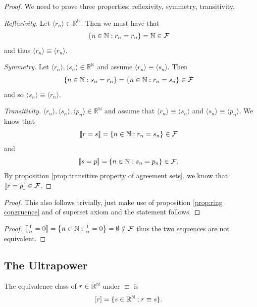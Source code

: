 \begin{proof}
    We need to prove three properties: reflexivity, symmetry, transitivity. 

    \emph{Reflexivity.} Let $\langle r_n \rangle \in \mathbb{R}^\mathbb{N}$. Then we must have that 
    $$
    \{ n \in \mathbb{N} : r_n = r_n \} = \mathbb{N} \in \mathcal{F}
    $$
    and thus $\langle r_n \rangle \equiv \langle r_n \rangle$.

    \emph{Symmetry.} Let $\langle r_n \rangle, \langle s_n \rangle \in \mathbb{R}^\mathbb{N}$ and assume $\langle r_n \rangle \equiv \langle s_n \rangle$. Then 
    $$
    \{ n \in \mathbb{N} : s_n = r_n \} = \{ n \in \mathbb{N} : r_n = s_n \} \in \mathcal{F}
    $$
    and so $\langle s_n \rangle \equiv \langle r_n \rangle$.

    \emph{Transitivity.} $\langle r_n \rangle, \langle s_n \rangle, \langle p_n \rangle \in \mathbb{R}^\mathbb{N}$ and assume that $\langle r_n \rangle \equiv \langle s_n \rangle$ and $\langle s_n \rangle \equiv \langle p_n \rangle$. We know that
    $$
    \llbracket r=s\rrbracket = \{ n \in \mathbb{N} : r_n = s_n \} \in \mathcal{F}
    $$
    and
    $$
    \llbracket s=p\rrbracket = \{ n \in \mathbb{N} : s_n = p_n \} \in \mathcal{F}.
    $$
    By proposition \ref{prop:transitive property of agreement sets}, we know that $\llbracket r=p\rrbracket \in \mathcal{F}$.
\end{proof}
\begin{proof}
        This also follows trivially, just make use of proposition \ref{prop:ring congruence} and of superset axiom and the statement follows. 
\end{proof}

    
\begin{proof}
    $\llbracket \frac{1}{n} = 0 \rrbracket = \left\{ n \in \mathbb{N} : \frac{1}{n} = 0  \right\}=\emptyset \notin \mathcal{F}$ thus the two sequences are not equivalent. 
\end{proof}

\subsection{The Ultrapower}

The equivalence class of $r \in \mathbb{R}^{\mathbb{N}}$ under $\equiv$ is
$$
[r] = \{s \in \mathbb{R}^{\mathbb{N}} : r \equiv s\}.
$$

